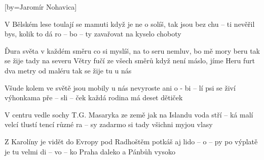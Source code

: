 [by={Jaromír Nohavica}]

\beginverse{}
V Bělském lese toulají se mamuti
když je ne o solíš, tak jsou bez chu -- ti
nevěřil bys, kolik to dá ro -- bo -- ty
zavařovat na kyselo choboty
\endverse{}

\beginchorus{}
Ďura světa v každém směru
co si myslíš, na to seru
nemluv, bo mě mory beru
tak se žije tady na severu
Větry fučí ze všech směrů
když není máslo, jíme Heru
furt dva metry od maléru
tak se žije tu u nás
\endchorus{}

\beginverse{}
\chordsoff{}
Všude kolem ve světě jsou mobily
u nás nevyroste ani o - bi -- lí
psi se živí výhonkama pře -- sli -- ček
každá rodina má deset dětiček
\chordson{}
\endverse{}

\beginchorus{}
\chordsoff{}
\phantom{}
\chordson{}
\endchorus{}

\beginverse{}
\chordsoff{}
V centru vedle sochy T.G. Masaryka
ze země jak na Islandu voda stří -- ká
malí velcí tlustí tencí různé ra -- sy
zadarmo si tady všichni myjou vlasy
\chordson{}
\endverse{}

\beginchorus{}
\chordsoff{}
\phantom{}
\chordson{}
\endchorus{}

\beginverse{}
\chordsoff{}
Z Karolíny je vidět do Evropy 
pod Radhoštěm potkáš aj lido -- o -- py
po výplatě je tu velmi di -- vo -- ko
Praha daleko a Pánbůh vysoko
\chordson{}
\endverse{}

\beginchorus{}
\chordsoff{}
\phantom{}
\chordson{}
\endchorus{}

\endsong{}

